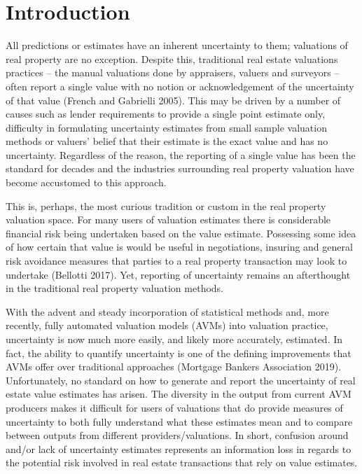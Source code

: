 \documentclass[colTwo]{anon}
\theoremstyle{definition}
\begin{document}
\section{Introduction}
All predictions or estimates have an inherent uncertainty to them; valuations of real property are no exception. Despite this, traditional real estate valuations practices -- the manual valuations done by appraisers, valuers and surveyors -- often report a single value with no notion or acknowledgement of the uncertainty of that value (French and Gabrielli 2005).  This may be driven by a number of causes such as lender requirements to provide a single point estimate only, difficulty in formulating uncertainty estimates from small sample valuation methods or valuers' belief that their estimate is the exact value and has no uncertainty.  Regardless of the reason, the reporting of a single value has been the standard for decades and the industries surrounding real property valuation have become accustomed to this approach.

This is, perhaps, the most curious tradition or custom in the real property valuation space.  For many users of valuation estimates there is considerable financial risk being undertaken based on the value estimate.  Possessing some idea of how certain that value is would be useful in negotiations, insuring and general risk avoidance measures that parties to a real property transaction may look to undertake (Bellotti 2017).  Yet, reporting of uncertainty remains an afterthought in the traditional real property valuation methods.

With the advent and steady incorporation of statistical methods and, more recently, fully automated valuation models (AVMs) into valuation practice, uncertainty is now much more easily, and likely more accurately, estimated. In fact, the ability to quantify uncertainty is one of the defining improvements that AVMs offer over traditional approaches (Mortgage Bankers Association 2019). Unfortunately, no standard on how to generate and report the uncertainty of real estate value estimates has arisen.  The diversity in the output from current AVM producers makes it difficult for users of valuations that do provide measures of uncertainty to both fully understand what these estimates mean and to compare between outputs from different providers/valuations.  In short, confusion around and/or lack of uncertainty estimates represents an information loss in regards to the potential risk involved in real estate transactions that rely on value estimates.
\end{document}
